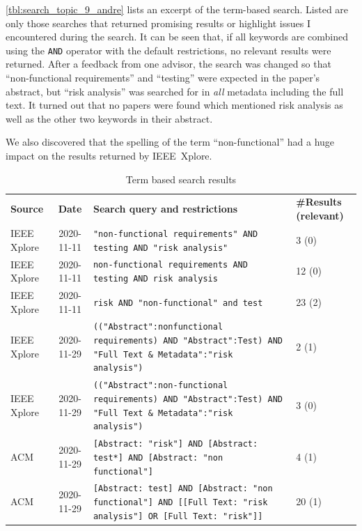 \autoref{tbl:search_topic_9_andre} lists an excerpt of the term-based search.
Listed are only those searches that returned promising results or highlight issues I encountered during the search.
It can be seen that, if all keywords are combined using the \texttt{AND} operator with the default restrictions, no relevant results were returned.
After a feedback from one advisor, the search was changed so that \enquote{non-functional requirements} and \enquote{testing} were expected in the paper's abstract, but \enquote{risk analysis} was searched for in \textit{all} metadata including the full text.
It turned out that no papers were found which mentioned risk analysis as well as the other two keywords in their abstract.

We also discovered that the spelling of the term \enquote{non-functional} had a huge impact on the results returned by IEEE~Xplore.

\begin{small}
	\centering
	\begin{longtable}[h]{p{}|c|p{}|p{}}
		\caption{Term based search results}
		\label{tbl:search_topic_9_andre}
		\setlength{\tabcolsep}{1em}\\    %
		\toprule
		\textbf{Source} & \textbf{Date} & \textbf{Search query and restrictions} & \textbf{\#Results (relevant)} \\
		
		\midrule
		IEEE Xplore & 2020-11-11 & \texttt{"{}non-functional requirements"{} AND testing AND "{}risk analysis"{}} & 3 (0) \\
		
		\midrule
		IEEE Xplore & 2020-11-11 & \texttt{non-functional requirements AND testing AND risk analysis} & 12 (0) \\
		
		\midrule
		IEEE Xplore & 2020-11-11 & \texttt{risk AND "non-functional" and test} & 23 (2) \\
		
		\midrule
		IEEE Xplore & 2020-11-29 & \texttt{(("{}Abstract"{}:nonfunctional requirements) AND "{}Abstract"{}:Test) AND "Full Text \& Metadata":"{}risk analysis"{})} & 2 (1) \\
		
		\midrule
		IEEE Xplore & 2020-11-29 & \texttt{(("{}Abstract"{}:non-functional requirements) AND "{}Abstract"{}:Test) AND "Full Text \& Metadata":"{}risk analysis"{})} & 3 (0) \\

		\midrule
		ACM & 2020-11-29 & \texttt{[Abstract: "{}risk"{}] AND [Abstract: test*] AND [Abstract: "{}non functional"{}]} & 4 (1) \\
		
		\midrule
		ACM & 2020-11-29 & \texttt{[Abstract: test] AND [Abstract: "{}non functional"{}] AND [[Full Text: "{}risk analysis"{}] OR [Full Text: "{}risk"{}]]} & 20 (1) \\
		\bottomrule
	\end{longtable}
\end{small}

